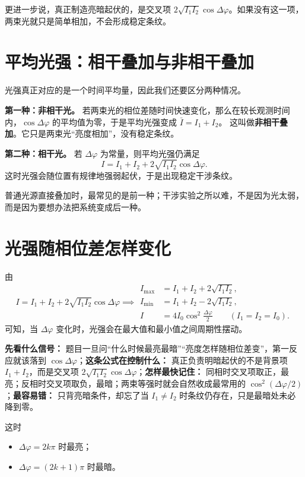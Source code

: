 \documentclass[lang=cn,11pt]{elegantbook}
\newcommand{\bridge}[1]{\begin{note}#1\end{note}}
\begin{document}
\bridge{更进一步说，真正制造亮暗起伏的，是交叉项 \(2\sqrt{I_1I_2}\cos\Delta\varphi\)。如果没有这一项，两束光就只是简单相加，不会形成稳定条纹。}

\section{平均光强：相干叠加与非相干叠加}

光强真正对应的是一个时间平均量，因此我们还要区分两种情况。

\textbf{第一种：非相干光。} 若两束光的相位差随时间快速变化，那么在较长观测时间内，\(\cos\Delta\varphi\) 的平均值为零，于是平均光强变成 \(\bar I=I_1+I_2\)。
这叫做\textbf{非相干叠加}。它只是两束光“亮度相加”，没有稳定条纹。

\textbf{第二种：相干光。} 若 \(\Delta\varphi\) 为常量，则平均光强仍满足
\[
I=I_1+I_2+2\sqrt{I_1I_2}\cos\Delta\varphi.
\]
这时光强会随位置有规律地强弱起伏，于是出现稳定干涉条纹。

\begin{note}
普通光源直接叠加时，最常见的是前一种；干涉实验之所以难，不是因为光太弱，而是因为要想办法把系统变成后一种。
\end{note}

\section{光强随相位差怎样变化}

由
\[
I=I_1+I_2+2\sqrt{I_1I_2}\cos\Delta\varphi
\implies
\begin{aligned}
I_{\max}&=I_1+I_2+2\sqrt{I_1I_2},\\
I_{\min}&=I_1+I_2-2\sqrt{I_1I_2},\\
I&=4I_0\cos^2\frac{\Delta\varphi}{2}\qquad (I_1=I_2=I_0).
\end{aligned}
\]
可知，当 \(\Delta\varphi\) 变化时，光强会在最大值和最小值之间周期性摆动。

\begin{note}
\textbf{先看什么信号：} 题目一旦问“什么时候最亮最暗”“亮度怎样随相位差变”，第一反应就该落到 \(\cos\Delta\varphi\)；\textbf{这条公式在控制什么：} 真正负责明暗起伏的不是背景项 \(I_1+I_2\)，而是交叉项 \(2\sqrt{I_1I_2}\cos\Delta\varphi\)；\textbf{怎样最快记住：} 同相时交叉项取正，最亮；反相时交叉项取负，最暗；两束等强时就会自然收成最常用的 \(\cos^2(\Delta\varphi/2)\)；\textbf{最容易错：} 只背亮暗条件，却忘了当 \(I_1\neq I_2\) 时条纹仍存在，只是最暗处未必降到零。
\end{note}

这时
\begin{itemize}
  \item \(\Delta\varphi=2k\pi\) 时最亮；
  \item \(\Delta\varphi=(2k+1)\pi\) 时最暗。
\end{itemize}
\end{document}
